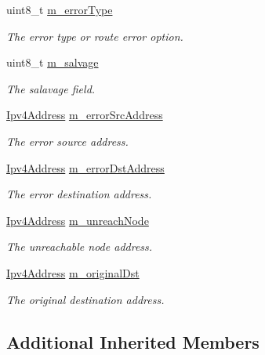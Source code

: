 \begin{DoxyCompactItemize}
\item 
uint8\+\_\+t \hyperlink{classns3_1_1dsr_1_1DsrOptionRerrUnreachHeader_a9496983f6b34cb76b8f64d1da8239355}{m\+\_\+error\+Type}
\begin{DoxyCompactList}\small\item\em The error type or route error option. \end{DoxyCompactList}\item 
uint8\+\_\+t \hyperlink{classns3_1_1dsr_1_1DsrOptionRerrUnreachHeader_ad09b2e2c3dfeaa051cedfa4fcd906924}{m\+\_\+salvage}
\begin{DoxyCompactList}\small\item\em The salavage field. \end{DoxyCompactList}\item 
\hyperlink{classns3_1_1Ipv4Address}{Ipv4\+Address} \hyperlink{classns3_1_1dsr_1_1DsrOptionRerrUnreachHeader_ac17b78ebdbbe6d1008ac081efb14058a}{m\+\_\+error\+Src\+Address}
\begin{DoxyCompactList}\small\item\em The error source address. \end{DoxyCompactList}\item 
\hyperlink{classns3_1_1Ipv4Address}{Ipv4\+Address} \hyperlink{classns3_1_1dsr_1_1DsrOptionRerrUnreachHeader_ae3b00660fc5ba2a28f997ce4dd3de68e}{m\+\_\+error\+Dst\+Address}
\begin{DoxyCompactList}\small\item\em The error destination address. \end{DoxyCompactList}\item 
\hyperlink{classns3_1_1Ipv4Address}{Ipv4\+Address} \hyperlink{classns3_1_1dsr_1_1DsrOptionRerrUnreachHeader_a3951086503fabe8a1828059a27b41247}{m\+\_\+unreach\+Node}
\begin{DoxyCompactList}\small\item\em The unreachable node address. \end{DoxyCompactList}\item 
\hyperlink{classns3_1_1Ipv4Address}{Ipv4\+Address} \hyperlink{classns3_1_1dsr_1_1DsrOptionRerrUnreachHeader_ad42a2044d431b45a375889dd68400b64}{m\+\_\+original\+Dst}
\begin{DoxyCompactList}\small\item\em The original destination address. \end{DoxyCompactList}\end{DoxyCompactItemize}
\subsection*{Additional Inherited Members}


